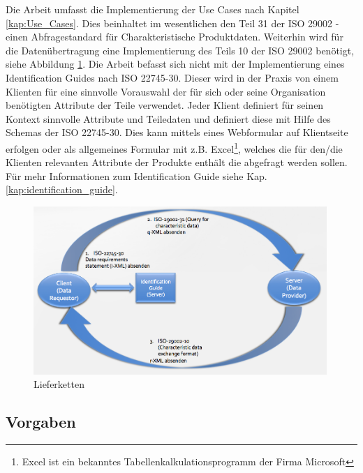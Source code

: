 Die Arbeit umfasst die Implementierung der Use Cases nach Kapitel \ref{kap:Use_Cases}. Dies beinhaltet im wesentlichen den Teil 31 der ISO 29002 - einen Abfragestandard für Charakteristische Produktdaten. 
Weiterhin wird für die Datenübertragung eine Implementierung des Teils 10 der ISO 29002 benötigt, siehe Abbildung \ref{fig:lieferketten}. 
Die Arbeit befasst sich nicht mit der Implementierung eines Identification Guides nach ISO 22745-30. Dieser wird in der Praxis von einem Klienten für eine sinnvolle Vorauswahl der für sich oder seine Organisation benötigten Attribute der Teile verwendet. Jeder Klient definiert für seinen Kontext sinnvolle Attribute und Teiledaten und definiert diese mit Hilfe des Schemas der ISO 22745-30. Dies kann mittels eines Webformular auf Klientseite erfolgen oder als allgemeines Formular mit z.B. Excel\footnote{Excel ist ein bekanntes Tabellenkalkulationsprogramm der Firma Microsoft}, welches die für den/die Klienten relevanten Attribute der Produkte enthält die abgefragt werden sollen. Für mehr Informationen zum Identification Guide siehe Kap. \ref{kap:identification_guide}.

\begin{figure}[htbp]
	\centering
		\includegraphics[width=0.99\textwidth]{images/lieferketten_plib.png}
		\caption[Lieferketten]{Lieferketten\footnotemark}
	\label{fig:lieferketten}
\end{figure}

\subsection{Vorgaben}

